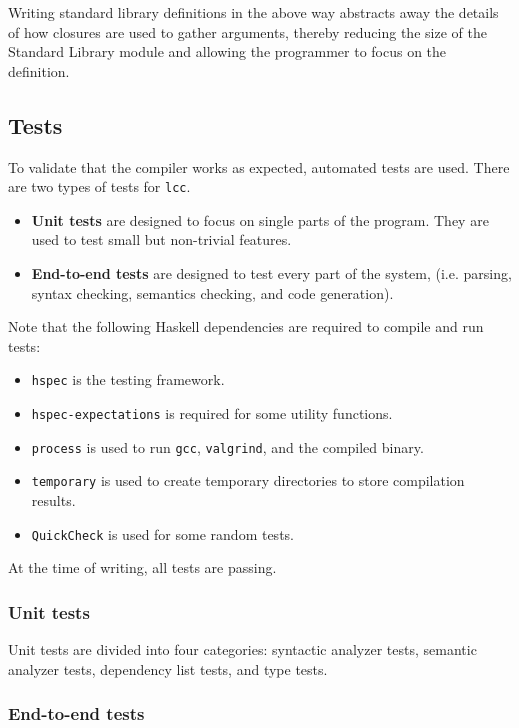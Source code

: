 \documentclass[12pt]{article}
\begin{document}
Writing standard library definitions in the above way abstracts away the details
of how closures are used to gather arguments, thereby reducing the size of the
Standard Library module and allowing the programmer to focus on the definition.

\subsection{Tests}

To validate that the compiler works as expected, automated tests are used. There
are two types of tests for \verb$lcc$.
\begin{itemize}
    \item \textbf{Unit tests} are designed to focus on single parts of the program.
        They are used to test small but non-trivial features.
    \item \textbf{End-to-end tests} are designed to test every part of the
        system, (i.e. parsing, syntax checking, semantics checking, and code
        generation). 
\end{itemize}
Note that the following Haskell dependencies are required to compile and run
tests:
\begin{itemize}
    \item \verb$hspec$ is the testing framework.
    \item \verb$hspec-expectations$ is required for some utility functions.
    \item \verb$process$ is used to run \verb$gcc$, \verb$valgrind$, and the
        compiled binary.
    \item \verb$temporary$ is used to create temporary directories to store
        compilation results.
    \item \verb$QuickCheck$ is used for some random tests.
\end{itemize}
At the time of writing, all tests are passing.

\subsubsection{Unit tests}

Unit tests are divided into four categories: syntactic analyzer tests, semantic
analyzer tests, dependency list tests, and type tests.

\subsubsection{End-to-end tests}
\end{document}
